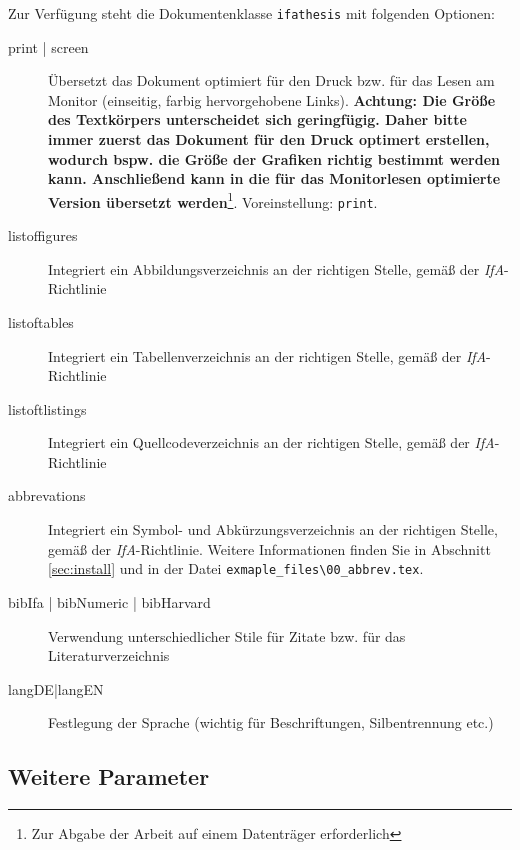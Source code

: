Zur Verfügung steht die Dokumentenklasse \verb-ifathesis- mit folgenden Optionen:

\begin{description}
  \item[print | screen] Übersetzt das Dokument optimiert für den Druck bzw. für das Lesen am Monitor (einseitig, farbig hervorgehobene Links). \textbf{Achtung: Die Größe des Textkörpers unterscheidet sich geringfügig. Daher bitte immer zuerst das Dokument für den Druck optimert erstellen, wodurch bspw. die Größe der Grafiken richtig bestimmt werden kann. Anschließend kann in die für das Monitorlesen optimierte Version übersetzt werden}\footnote{Zur Abgabe der Arbeit auf einem Datenträger erforderlich}. Voreinstellung: \verb-print-.
  \item[listoffigures] Integriert ein Abbildungsverzeichnis an der richtigen Stelle, gemäß der \emph{IfA}-Richtlinie
  \item[listoftables] Integriert ein Tabellenverzeichnis an der richtigen Stelle, gemäß der \emph{IfA}-Richtlinie
  \item[listoftlistings] Integriert ein Quellcodeverzeichnis an der richtigen Stelle, gemäß der \emph{IfA}-Richtlinie
  \item[abbrevations] Integriert ein Symbol- und Abkürzungsverzeichnis an der richtigen Stelle, gemäß der \emph{IfA}-Richtlinie. Weitere Informationen finden Sie in Abschnitt \ref{sec:install} und in der Datei \verb-exmaple_files\00_abbrev.tex-.
  \item[bibIfa | bibNumeric | bibHarvard] Verwendung unterschiedlicher Stile für
  Zitate bzw. für das Literaturverzeichnis
  \item[langDE|langEN] Festlegung der Sprache (wichtig für Beschriftungen, Silbentrennung etc.)
\end{description}


\subsection{Weitere Parameter}

